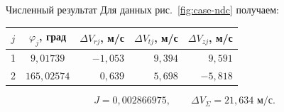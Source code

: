 \begin{explanation}{Численный результат}
Для данных рис.~\ref{fig:case-ndc} получаем:
\begin{center}\begin{tabular}{cc|rrr}
$j$ & $\varphi_j$, град & $\Delta V_{rj}$, м/с & $\Delta V_{tj}$, м/с & $\Delta V_{zj}$, м/с\\\hline
1 & $9{,}01739$ & $-1{,}053$ & $9{,}394$ & $9{,}591$\\
2 & $165{,}02574$ & $0{,}639$ & $5{,}698$ & $-5{,}818$\\
\end{tabular}\end{center}
\[ J=0{,}002866975,\qquad \Delta V_\Sigma=21{,}634\text{ м/с}.\]
\end{explanation}
